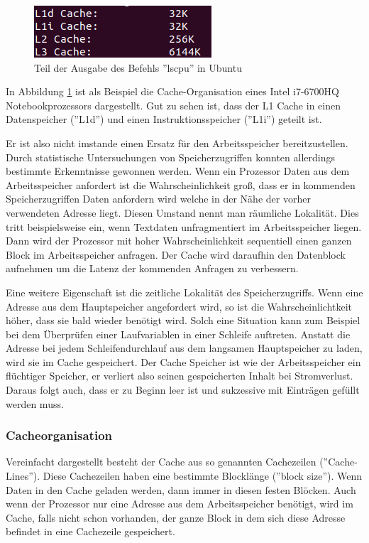 \documentclass[12pt]{article}
\begin{document}
\begin{figure}[!htb]
\centering
\includegraphics[scale=0.5]{lscpu}
\caption{Teil der Ausgabe des Befehls ''lscpu'' in Ubuntu}
\centering
\label{fig:lscpu}
\end{figure}

\noindent In Abbildung \ref{fig:lscpu} ist als Beispiel die Cache-Organisation eines Intel i7-6700HQ Notebookprozessors dargestellt. Gut zu sehen ist, dass der L1 Cache in einen Datenspeicher (''L1d'') und einen Instruktionsspeicher (''L1i'') geteilt ist. 

\noindent Er ist also nicht imstande einen Ersatz für den Arbeitsspeicher bereitzustellen. Durch statistische Untersuchungen von Speicherzugriffen konnten allerdings bestimmte Erkenntnisse gewonnen werden. Wenn ein Prozessor Daten aus dem Arbeitsspeicher anfordert ist die Wahrscheinlichkeit groß, dass er in kommenden Speicherzugriffen Daten anfordern wird welche in der Nähe der vorher verwendeten Adresse liegt. Diesen Umstand nennt man räumliche Lokalität. Dies tritt beispielsweise ein, wenn Textdaten unfragmentiert im Arbeitsspeicher liegen. Dann wird der Prozessor mit hoher Wahrscheinlichkeit sequentiell einen ganzen Block im Arbeitsspeicher anfragen. Der Cache wird daraufhin den Datenblock aufnehmen um die Latenz der kommenden Anfragen zu verbessern. 

\noindent Eine weitere Eigenschaft ist die zeitliche Lokalität des Speicherzugriffs. Wenn eine Adresse aus dem Hauptspeicher angefordert wird, so ist die Wahrscheinlichtkeit höher, dass sie bald wieder benötigt wird. Solch eine Situation kann zum Beispiel bei dem Überprüfen einer Laufvariablen in einer Schleife auftreten. Anstatt die Adresse bei jedem Schleifendurchlauf aus dem langsamen Hauptspeicher zu laden, wird sie im Cache gespeichert. 
Der Cache Speicher ist wie der Arbeitsspeicher ein flüchtiger Speicher, er verliert also seinen gespeicherten Inhalt bei Stromverlust. Daraus folgt auch, dass er zu Beginn leer ist und sukzessive mit Einträgen gefüllt werden muss.\cite[S.180-188]{mikroprozessortechnik2011}
\subsubsection{Cacheorganisation}
Vereinfacht dargestellt besteht der Cache aus so genannten Cachezeilen (''Cache-Lines''). Diese Cachezeilen haben eine bestimmte Blocklänge (''block size'')\cite[S.183]{mikroprozessortechnik2011}. Wenn Daten in den Cache geladen werden, dann immer in diesen festen Blöcken. Auch wenn der Prozessor nur eine Adresse aus dem Arbeitsspeicher benötigt, wird im Cache, falls nicht schon vorhanden, der ganze Block in dem sich diese Adresse befindet in eine Cachezeile gespeichert.
\end{document}
